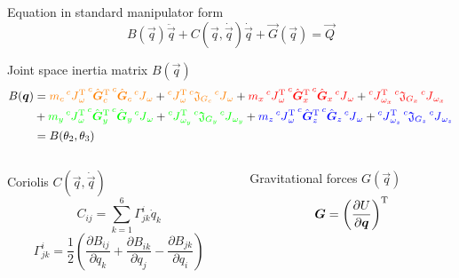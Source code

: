 \begin{frame}[shrink=30]{Equation in standard manipulator form}
  \[
  B(\vec{q}) \ddot{\vec{q}} + C(\vec{q}, \dot{\vec{q}}) \dot{\vec{q}} + \vec{G}(\vec{q}) = \vec{Q}
  \]
  \begin{block}{Joint space inertia matrix $B(\vec{q})$}
    \[
    \begin{split}
      B(\boldsymbol{q}) &= {\color{orange}m_c \prescript{c}{}{J}_{\omega}^{\mathrm{T}} \prescript{c}{}{\hat{\boldsymbol{G}}}_{c} ^{\mathrm{T}}  \prescript{c}{}{\hat{\boldsymbol{G}}}_{c} \prescript{c}{}{J}_{\omega}} + {\color{orange}\prescript{c}{}{J}_{\omega}^{\mathrm{T}}  \prescript{c}{}{\mathfrak{J}}_{G_{c}} \prescript{c}{}{J}_{\omega}} + 
      {\color{red}m_x \prescript{c}{}{J}_{\omega}^{\mathrm{T}} \prescript{c}{}{\hat{\boldsymbol{G}}}_{x} ^{\mathrm{T}}  \prescript{c}{}{\hat{\boldsymbol{G}}}_{x} \prescript{c}{}{J}_{\omega}} + 
      {\color{red}\prescript{c}{}{J}_{\omega_{x}}^{\mathrm{T}}  \prescript{c}{}{\mathfrak{J}}_{G_{x}} \prescript{c}{}{J}_{\omega_{x}}} \\
      &+ {\color{green}m_y \prescript{c}{}{J}_{\omega}^{\mathrm{T}} \prescript{c}{}{\hat{\boldsymbol{G}}}_{y} ^{\mathrm{T}}  \prescript{c}{}{\hat{\boldsymbol{G}}}_{y} \prescript{c}{}{J}_{\omega}} + 
      {\color{green}\prescript{c}{}{J}_{\omega_{y}}^{\mathrm{T}}  \prescript{c}{}{\mathfrak{J}}_{G_{y}} \prescript{c}{}{J}_{\omega_{y}}} 
      + {\color{blue}m_z \prescript{c}{}{J}_{\omega}^{\mathrm{T}} \prescript{c}{}{\hat{\boldsymbol{G}}}_{z} ^{\mathrm{T}}  \prescript{c}{}{\hat{\boldsymbol{G}}}_{z} \prescript{c}{}{J}_{\omega}} + {\color{blue}\prescript{c}{}{J}_{\omega_{z}}^{\mathrm{T}}  \prescript{c}{}{\mathfrak{J}}_{G_{z}} \prescript{c}{}{J}_{\omega_{z}}}\\
      & = B(\theta_2, \theta_3)
    \end{split}
    \]
  \end{block}
  \begin{columns}
    \begin{column}{0.5\textwidth}
      \begin{block}{Coriolis $C(\vec{q}, \dot{\vec{q}})$}
        \[
        C_{ij} = \sum_{k=1}^6{\Gamma^i_{jk} \dot{q}_k}
        \]
        \[
        \Gamma^i_{jk} = \frac{1}{2} \left ( \frac{\partial B_{ij}}{\partial q_k}
        + \frac{\partial B_{ik}}{\partial q_j}
        - \frac{\partial B_{jk}}{\partial q_i}\right)
        \]
      \end{block}
    \end{column}
    \begin{column}{0.5\textwidth}
      \begin{block}{Gravitational forces $G(\vec{q})$}
        \[
        \boldsymbol{G} =\left(\frac{\partial U}{\partial \boldsymbol{q}}\right) ^{\mathrm{T}}
\]
\end{block}
\end{column}
\end{columns}
\end{frame}
